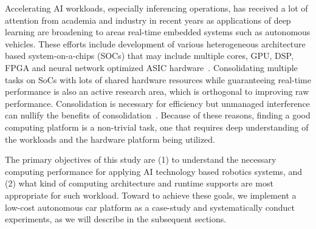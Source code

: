 Accelerating AI workloads, especially inferencing
operations, has received a lot of attention from academia and industry
in recent years as applications of deep learning are broadening to
areas real-time embedded systems such as autonomous vehicles. These
efforts include development of various heterogeneous architecture
based system-on-a-chips (SOCs) that may include multiple cores, GPU,
DSP, FPGA and neural network optimized ASIC hardware~\cite{Jouppi2017}.
Consolidating multiple tasks on SoCs with lots of shared hardware
resources while guaranteeing real-time performance is also an active
research area, which is orthogonal to improving raw
performance. Consolidation is necessary for efficiency but unmanaged 
interference can nullify the benefits of consolidation~\cite{Kim2016}.
Because of these reasons, finding a good computing platform is a
non-trivial task, one that requires deep understanding of the
workloads and the hardware platform being utilized.

The primary objectives of this study are (1) to understand the
necessary computing performance for applying AI technology based
robotics systems, and (2) what kind of computing architecture and
runtime supports are most appropriate for such workload. Toward to
achieve these goals, we implement a low-cost autonomous car platform
as a case-study and systematically conduct experiments, as we will 
describe in the subsequent sections.
